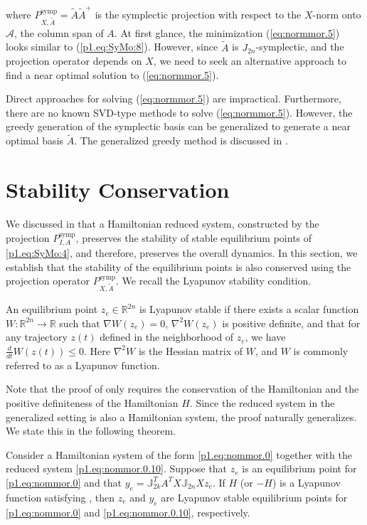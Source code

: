 where $P^\text{symp}_{X,\tilde A} = \tilde A \tilde A^+$ is the symplectic projection with respect to the $X$-norm onto $\mathcal A$, the column span of $A$. At first glance, the minimization (\ref{eq:normmor.5}) looks similar to (\ref{p1.eq:SyMo:8}). However, since $\tilde A$ is $J_{2n}$-symplectic, and the projection operator depends on $X$, we need to seek an alternative approach to find a near optimal solution to (\ref{eq:normmor.5}). 

Direct approaches for solving (\ref{eq:normmor.5}) are impractical. Furthermore, there are no known SVD-type methods to solve (\ref{eq:normmor.5}). However, the greedy generation of the symplectic basis can be generalized to generate a near optimal basis $\tilde A$. The generalized greedy method is discussed in .

\section{Stability Conservation} 
We discussed in  that a Hamiltonian reduced system, constructed by the projection $P^{\text{symp}}_{I,A}$, preserves the stability of stable equilibrium points of \eqref{p1.eq:SyMo:4}, and therefore, preserves the overall dynamics. In this section, we establish that the stability of the equilibrium points is also conserved using the projection operator $P^{\text{symp}}_{X,\tilde A}$. We recall the Lyapunov stability condition.

\begin{proposition} \label{prop:new1}
\cite{bhatia2002stability} An equilibrium point $z_e\in \mathbb R^{2n}$ is Lyapunov stable if there exists a scalar function $W:\mathbb R^{2n} \to \mathbb R$ such that $\nabla W(z_e) = 0$, $\nabla^2 W(z_e)$ is positive definite, and that for any trajectory $z(t)$ defined in the neighborhood of $z_e$, we have $\frac{d}{dt} W(z(t))\leq 0$. Here $\nabla^2 W$ is the Hessian matrix of $W$, and $W$ is commonly referred to as a Lyapunov function.
\end{proposition}

Note that the proof of  only requires the conservation of the Hamiltonian and the positive definiteness of the Hamiltonian $H$. Since the reduced system in the generalized setting is also a Hamiltonian system, the proof naturally generalizes. We state this in the following theorem.

\begin{theorem}
\cite{doi:10.1137/17M1111991} Consider a Hamiltonian system of the form \eqref{p1.eq:nommor.0} together with the reduced system \eqref{p1.eq:nommor.0.10}. Suppose that $z_e$ is an equilibrium point for \eqref{p1.eq:nommor.0} and that $y_e = \mathbb J_{2k}^T A^T X \mathbb J_{2n} X z_e$. If $H$ (or $-H$) is a Lyapunov function satisfying , then $z_e$ and $y_e$ are Lyapunov stable equilibrium points for \eqref{p1.eq:nommor.0} and \eqref{p1.eq:nommor.0.10}, respectively.
\end{theorem}

